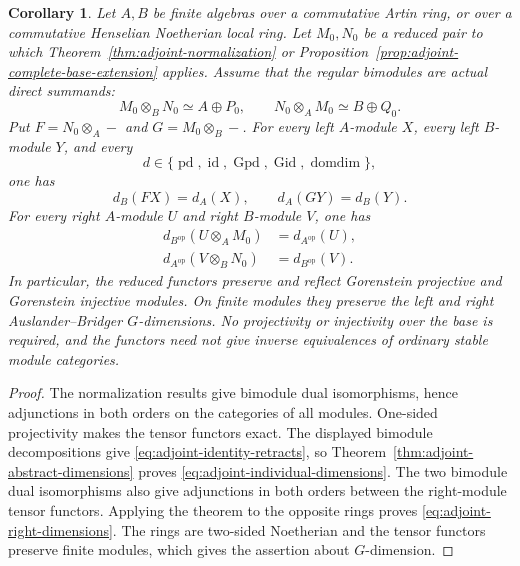 \documentclass[12pt,a4paper,english,reqno]{amsart}
\numberwithin{equation}{section}
\theoremstyle{plain}
\newtheorem{corollary}[theorem]{Corollary}
\theoremstyle{definition}
\begin{document}
\begin{corollary}
\label{cor:adjoint-individual-dimensions}
Let $A,B$ be finite algebras over a commutative Artin ring, or over a
commutative Henselian Noetherian local ring.  Let $M_0,N_0$ be a
reduced pair to which Theorem~\ref{thm:adjoint-normalization} or
Proposition~\ref{prop:adjoint-complete-base-extension} applies.
Assume that the regular bimodules are actual direct summands:
\[
 M_0\otimes_BN_0\simeq A\oplus P_0,\qquad
 N_0\otimes_AM_0\simeq B\oplus Q_0.
\]
Put $F=N_0\otimes_A-$ and $G=M_0\otimes_B-$.
For every left $A$-module $X$, every left $B$-module $Y$, and every
\[
 d\in\{\operatorname{pd},\operatorname{id},
          \operatorname{Gpd},\operatorname{Gid},
          \operatorname{domdim}\},
\]
one has
\begin{equation}
 d_B(FX)=d_A(X),\qquad d_A(GY)=d_B(Y).
 \label{eq:adjoint-individual-dimensions}
\end{equation}
For every right $A$-module $U$ and right $B$-module $V$, one has
\begin{equation}
 \begin{aligned}
 d_{B^{\mathrm{op}}}(U\otimes_A M_0)&=d_{A^{\mathrm{op}}}(U),\\
 d_{A^{\mathrm{op}}}(V\otimes_B N_0)&=d_{B^{\mathrm{op}}}(V).
 \end{aligned}
 \label{eq:adjoint-right-dimensions}
\end{equation}
In particular, the reduced functors preserve and reflect Gorenstein
projective and Gorenstein injective modules.  On finite modules they
preserve the left and right Auslander--Bridger $G$-dimensions.
No projectivity or injectivity over the base is required, and the
functors need not give inverse equivalences of ordinary stable
module categories.
\end{corollary}

\begin{proof}
The normalization results give bimodule dual isomorphisms, hence
adjunctions in both orders on the categories of all modules.
One-sided projectivity makes the tensor functors exact.  The displayed
bimodule decompositions give
\eqref{eq:adjoint-identity-retracts}, so
Theorem~\ref{thm:adjoint-abstract-dimensions} proves
\eqref{eq:adjoint-individual-dimensions}.  The two bimodule dual
isomorphisms also give adjunctions in both orders between the
right-module tensor functors.  Applying the theorem to the opposite
rings proves \eqref{eq:adjoint-right-dimensions}.
The rings are two-sided Noetherian and the tensor functors preserve
finite modules, which gives the assertion about $G$-dimension.
\end{proof}
\end{document}
